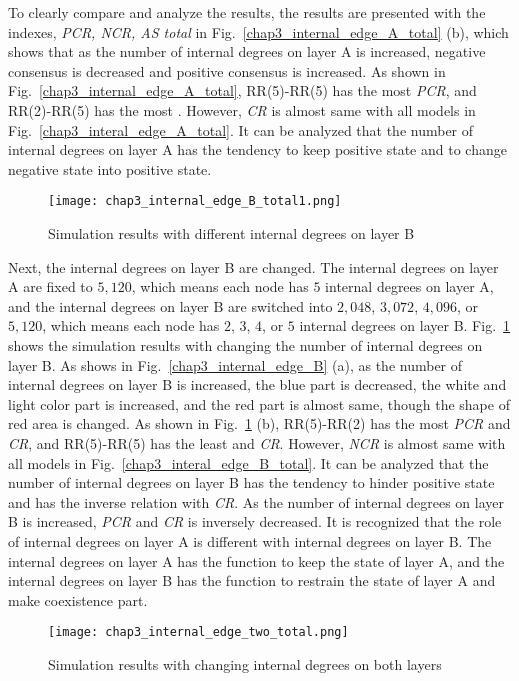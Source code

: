 To clearly compare and analyze the results, the results are presented with the indexes, \textit{PCR, NCR, AS total} in Fig.~\ref{chap3_internal_edge_A_total} (b), which shows that as the number of internal degrees on layer A is increased, negative consensus is decreased and positive consensus is increased. As shown in Fig.~\ref{chap3_internal_edge_A_total}, RR(5)-RR(5) has the most \textit{PCR}, and RR(2)-RR(5) has the most . However, \textit{CR} is almost same with all models in Fig.~\ref{chap3_interal_edge_A_total}. It can be analyzed that the number of internal degrees on layer A has the tendency to keep positive state and to change negative state into positive state. 
\begin{figure}[!htb]
	\centering
	\texttt{[image: chap3\_internal\_edge\_B\_total1.png]}
	\caption{Simulation results with different internal degrees on layer B}
	\label{chap3_internal_edge_B_total}
\end{figure}
Next, the internal degrees on layer B are changed. The internal degrees on layer A are fixed to  $5,120$, which means each node has $5$ internal degrees on layer A, and the internal degrees on layer B are switched into $2,048$, $3,072$, $4,096$, or $5,120$, which means each node has $2$, $3$, $4$, or $5$ internal degrees on layer B.  
Fig.~\ref{chap3_internal_edge_B_total} shows the simulation results with changing the number of internal degrees on layer B. As shows in Fig.~\ref{chap3_internal_edge_B} (a), as the number of internal degrees on layer B is increased, the blue part is decreased, the white and light color part is increased, and the red part is almost same, though the shape of red area is changed.  As shown in Fig.~\ref{chap3_internal_edge_B_total} (b), RR(5)-RR(2) has the most \textit{PCR} and \textit{CR}, and RR(5)-RR(5) has the least  and \textit{CR}. However, \textit{NCR} is almost same with all models in Fig.~\ref{chap3_interal_edge_B_total}. It can be analyzed that the number of internal degrees on layer B has the tendency to hinder positive state and has the inverse relation with \textit{CR}. As the number of internal degrees on layer B is increased, \textit{PCR} and \textit{CR} is inversely decreased. It is recognized that the role of internal degrees on layer A is different with internal degrees on layer B. The internal degrees on layer A has the function to keep the state of layer A, and the internal degrees on layer B has the function to restrain the state of layer A and make coexistence part. 
\begin{figure}[!htb]
	\centering
	\texttt{[image: chap3\_internal\_edge\_two\_total.png]}
	\caption{Simulation results with changing internal degrees on both layers}
	\label{chap3_internal_edge_two_total}
\end{figure}
